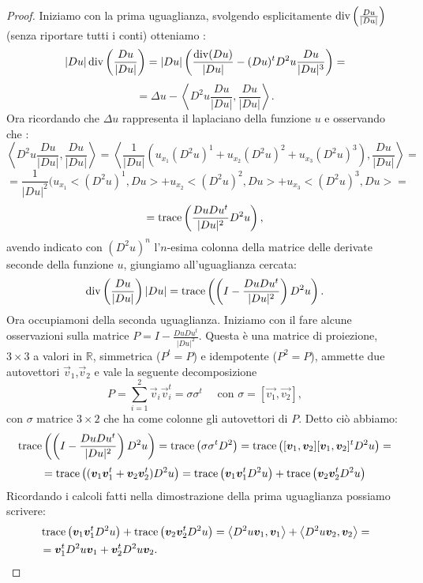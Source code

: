 \begin{proof}
Iniziamo con la prima uguaglianza, svolgendo esplicitamente $\operatorname{div}\left(\frac{Du}{|Du|}\right)$ (senza riportare tutti i conti) otteniamo :
\[
|Du|\operatorname{div}\left(\frac{Du}{|Du|}\right)=|Du|\left(\frac{\operatorname{div}(Du)}{|Du|} -(Du)^tD^2u\frac{Du}{|Du|^3}\right) =
\]
\[
= \Delta u - \left<D^2u\frac{Du}{|Du|},\frac{Du}{|Du|}\right> .
\]
Ora ricordando che $\Delta u$ rappresenta il laplaciano della funzione $u$ e osservando che :
\[
\left<D^2u\frac{Du}{|Du|},\frac{Du}{|Du|}\right> = \left<\frac{1}{|Du|}(u_{x_1}(D^2u)^1+u_{x_2}(D^2u)^2+u_{x_3}(D^2u)^3),\frac{Du}{|Du|}\right> =
\]
\[
=\frac{1}{|Du|^2}(u_{x_1}<(D^2u)^1,Du>+u_{x_2}<(D^2u)^2,Du>+u_{x_3}<(D^2u)^3,Du> = 
\]
\[
=\operatorname{trace}\left(\frac{DuDu^t}{|Du|^2}D^2u\right),
\]
avendo indicato con $(D^2u)^n$ l'$n$-esima colonna della matrice delle derivate seconde della funzione $u$, giungiamo all'uguaglianza cercata:
\[
\operatorname{div}\left(\frac{Du}{|Du|}\right)|Du| = \operatorname{trace}\left(\left(I-{\frac{DuDu^t}{|Du|^2}}\right)D^2u\right).
\] 
Ora occupiamoni della seconda uguaglianza. Iniziamo con il fare alcune osservazioni sulla matrice $P=I-\frac{DuDu^t}{|Du|^2}$. Questa è una matrice di proiezione, $3\times3$ a valori in $\mathbb{R}$, simmetrica ($P^t=P$) e idempotente ($P^2=P$), ammette due autovettori $\vec{v}_1$,$\vec{v}_2$ e vale la seguente decomposizione
\[
P=\sum_{i=1}^2\vec{v}_i\vec{v}_i^t=\sigma\sigma^t\quad\text{ con } \sigma=[\vec{v_1},\vec{v_2}],
\]
con $\sigma$ matrice $3\times2$ che ha come colonne gli autovettori di $P$. Detto ciò abbiamo: 
\[
\operatorname{trace}\left(\left(I-{\frac{DuDu^t}{|Du|^2}}\right)D^2u\right)=\operatorname{trace}\left(\sigma\sigma^tD^2\right)=\operatorname{trace}\left([\bm{v}_1,\bm{v}_2][\bm{v}_1,\bm{v}_2]^tD^2u\right)=
\]
\[
=\operatorname{trace}\left((\bm{v}_1\bm{v}_1^t+\bm{v}_2\bm{v}_2^t)D^2u\right)=\operatorname{trace}\left(\bm{v}_1\bm{v}_1^tD^2u\right)+\operatorname{trace}\left(\bm{v}_2\bm{v}_2^tD^2u\right)
\]
Ricordando i calcoli fatti nella dimostrazione della prima uguaglianza possiamo scrivere:
\[
\begin{split}
&\operatorname{trace}\left(\bm{v}_1\bm{v}_1^tD^2u\right)+\operatorname{trace}\left(\bm{v}_2\bm{v}_2^tD^2u\right)=\left<D^2u\bm{v}_1,\bm{v}_1\right>+\left<D^2u\bm{v}_2,\bm{v}_2\right>=\\
& =\bm{v}_1^tD^2u\bm{v}_1+\bm{v}_2^tD^2u\bm{v}_2.
\end{split}
\]
\end{proof}

